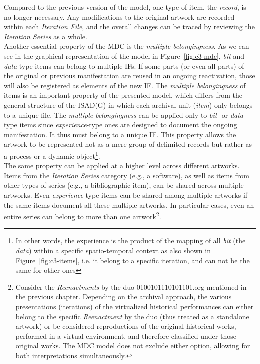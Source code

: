 Compared to the previous version of the model, one type of item, the \textit{record}, is no longer necessary. Any modifications to the original artwork are recorded within each \textit{Iteration File}, and the overall changes can be traced by reviewing the \textit{Iteration Series} as a whole.\\
Another essential property of the MDC is the \textit{multiple belongingness}. As we can see in the graphical representation of the model in Figure~\ref{fig:c3-mdc}, \textit{bit} and \textit{data} type items can belong to multiple IFs. If some parts (or even all parts) of the original or previous manifestation are reused in an ongoing reactivation, those will also be registered as elements of the new IF. The \textit{multiple belongingness} of items is an important property of the presented model, which differs from the general structure of the ISAD(G) in which each archival unit (\textit{item}) only belongs to a unique file. The \textit{multiple belongingness} can be applied only to \textit{bit}- or \textit{data}-type items since \textit{experience}-type ones are designed to document the ongoing manifestation. It thus must belong to a unique IF. This property allows the artwork to be represented not as a mere group of delimited records but rather as a process or a dynamic object\footnote{In other words, the experience is the product of the mapping of all \textit{bit} (the \textit{data}) within a specific spatio-temporal context as also shown in Figure~\ref{fig:c3-items}, i.e. it belong to a specific iteration, and can not be the same for other ones}.\\
The same property can be applied at a higher level across different artworks. Items from the \textit{Iteration Series} category (e.g., a software), as well as items from other types of series (e.g., a bibliographic item), can be shared across multiple artworks. Even \textit{experience}-type items can be shared among multiple artworks if the same items document all these multiple artworks. In particular cases, even an entire series can belong to more than one artwork\footnote{Consider the \textit{Reenactments} by the duo 0100101110101101.org mentioned in the previous chapter. Depending on the archival approach, the various presentations (iterations) of the virtualized historical performances can either belong to the specific \textit{Reenactment} by the duo (thus treated as a standalone artwork) or be considered reproductions of the original historical works, performed in a virtual environment, and therefore classified under those original works. The MDC model does not exclude either option, allowing for both interpretations simultaneously.}.\\
